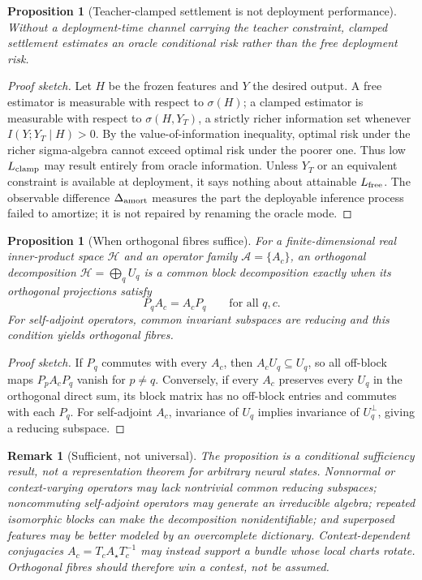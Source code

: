 \documentclass[11pt]{article}
\newtheorem{proposition}[definition]{Proposition}
\newtheorem{remark}[definition]{Remark}
\newcommand{\cH}{\mathcal H}
\begin{document}
\begin{proposition}[Teacher-clamped settlement is not deployment performance]
Without a deployment-time channel carrying the teacher constraint, clamped
settlement estimates an oracle conditional risk rather than the free
deployment risk.
\end{proposition}
\begin{proof}[Proof sketch]
Let $H$ be the frozen features and $Y$ the desired output.  A free estimator is
measurable with respect to $\sigma(H)$; a clamped estimator is measurable with
respect to $\sigma(H,Y_T)$, a strictly richer information set whenever
$I(Y;Y_T\mid H)>0$.  By the value-of-information inequality, optimal risk under
the richer sigma-algebra cannot exceed optimal risk under the poorer one.
Thus low $L_{\rm clamp}$ may result entirely from oracle information.  Unless
$Y_T$ or an equivalent constraint is available at deployment, it says nothing
about attainable $L_{\rm free}$.  The observable difference
$\Delta_{\rm amort}$ measures the part the deployable inference process failed
to amortize; it is not repaired by renaming the oracle mode.
\end{proof}

\begin{proposition}[When orthogonal fibres suffice]
For a finite-dimensional real inner-product space $\cH$ and an operator family
$\mathcal A=\{A_c\}$, an orthogonal decomposition
$\cH=\bigoplus_qU_q$ is a common block decomposition exactly when its
orthogonal projections satisfy
\[
 P_qA_c=A_cP_q\qquad\text{for all }q,c.
\]
For self-adjoint operators, common invariant subspaces are reducing and this
condition yields orthogonal fibres.
\end{proposition}
\begin{proof}[Proof sketch]
If $P_q$ commutes with every $A_c$, then $A_cU_q\subseteq U_q$, so all
off-block maps $P_pA_cP_q$ vanish for $p\ne q$.  Conversely, if every $A_c$
preserves every $U_q$ in the orthogonal direct sum, its block matrix has no
off-block entries and commutes with each $P_q$.  For self-adjoint $A_c$,
invariance of $U_q$ implies invariance of $U_q^\perp$, giving a reducing
subspace.
\end{proof}

\begin{remark}[Sufficient, not universal]
The proposition is a conditional sufficiency result, not a representation
theorem for arbitrary neural states.  Nonnormal or context-varying operators
may lack nontrivial common reducing subspaces; noncommuting self-adjoint
operators may generate an irreducible algebra; repeated isomorphic blocks can
make the decomposition nonidentifiable; and superposed features may be better
modeled by an overcomplete dictionary.  Context-dependent conjugacies
$A_c=T_cA_\star T_c^{-1}$ may instead support a bundle whose local charts
rotate.  Orthogonal fibres should therefore win a contest, not be assumed.
\end{remark}
\end{document}
